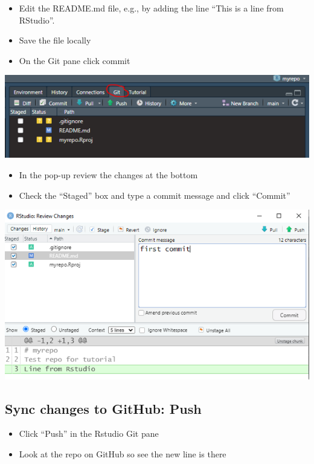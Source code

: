 \documentclass[
  letterpaper,
  DIV=11,
  numbers=noendperiod]{scrreprt}
\providecommand{\tightlist}{%
  \setlength{\itemsep}{0pt}\setlength{\parskip}{0pt}}\usepackage{longtable,booktabs,array}
\begin{document}
\begin{itemize}
\tightlist
\item
  Edit the README.md file, e.g., by adding the line ``This is a line
  from RStudio''.
\item
  Save the file locally
\item
  On the Git pane click commit
\end{itemize}

\includegraphics{assets/img/git_pane.png}

\begin{itemize}
\tightlist
\item
  In the pop-up review the changes at the bottom
\item
  Check the ``Staged'' box and type a commit message and click
  ``Commit''
\end{itemize}

\includegraphics{assets/img/git_commit_modal.png}

\hypertarget{sync-changes-to-github-push}{%
\subsection{Sync changes to GitHub:
Push}\label{sync-changes-to-github-push}}

\begin{itemize}
\tightlist
\item
  Click ``Push'' in the Rstudio Git pane
\item
  Look at the repo on GitHub so see the new line is there
\end{itemize}
\end{document}
